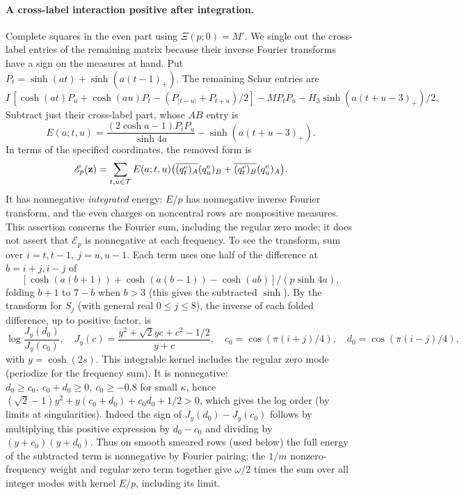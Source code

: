 \paragraph{A cross-label interaction positive after integration.}
Complete squares in the even part using \(\Xi(p;0)=M'\). We single out
the cross-label entries of the remaining matrix because their inverse
Fourier transforms have a sign on the measures at hand. Put
\(P_t=\sinh(at)+\sinh(a(t-1)_+)\). The remaining Schur entries are
\[
 I\,[\cosh(at)P_u+\cosh(au)P_t-(P_{|t-u|}+P_{t+u})/2]
 -M P_tP_u-H_3\sinh(a(t+u-3)_+)/2 .
\]
Subtract just their cross-label part, whose \(AB\) entry is
\[
 E(a;t,u)=\frac{(2\cosh a-1)P_tP_u}{\sinh4a}-\sinh(a(t+u-3)_+).
\]
In terms of the specified coordinates, the removed form is
\[
 \mathscr E_p(\mathbf z)=\sum_{t,u\in\mathcal T}E(a;t,u)
 \big(\overline{(q_t^{\rm e})_A}(q_u^{\rm e})_B
       +\overline{(q_t^{\rm e})_B}(q_u^{\rm e})_A\big).
\]
It has nonnegative \emph{integrated} energy: \(E/p\) has nonnegative
inverse Fourier transform, and the even charges on noncentral rows are
nonpositive measures. This assertion concerns the Fourier sum, including
the regular zero mode; it does not assert that \(\mathscr E_p\) is
nonnegative at each frequency. To see the transform, sum over \(i=t,t-1,\ j=u,u-1\). Each term uses one half of the difference at \(b=i+j,i-j\) of
\[
 [\cosh(a(b+1))+\cosh(a(b-1))-\cosh(ab)]/(p\sinh4a),
\]
folding \(b+1\) to \(7-b\) when \(b>3\) (this gives the subtracted \(\sinh\)). By the transform for \(S_j\) (with general real \(0\le j\le8\)), the inverse of each folded difference, up to positive factor, is
\[
 \log\frac{J_y(d_0)}{J_y(c_0)},\quad
 J_y(c)=\frac{y^2+\sqrt2 yc+c^2-1/2}{y+c},\quad
 c_0=\cos(\pi(i+j)/4),\quad d_0=\cos(\pi(i-j)/4),
\]
with \(y=\cosh(2s)\). This integrable kernel includes the regular zero mode (periodize for the frequency sum). It is nonnegative: \(d_0\ge c_0,\ c_0+d_0\ge0,\ c_0\ge-0.8\) for small \(\kappa\), hence \((\sqrt2-1)y^2+y(c_0+d_0)+c_0d_0+1/2>0\), which gives the log order (by limits at singularities). Indeed the sign of \(J_y(d_0)-J_y(c_0)\) follows by multiplying this positive expression by \(d_0-c_0\) and dividing by \((y+c_0)(y+d_0)\). Thus on smooth smeared rows (used below) the full energy of the subtracted term is nonnegative by Fourier pairing: the \(1/m\) nonzero-frequency weight and regular zero term together give \(\omega/2\) times the sum over all integer modes with kernel \(E/p\), including its limit.

